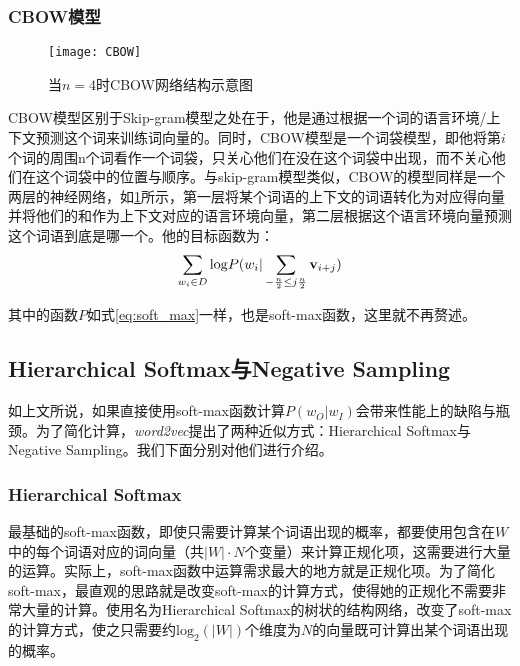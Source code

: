 \subsubsection{CBOW模型}

\begin{figure}
\centering
\texttt{[image: CBOW]}
\caption{当$n=4$时CBOW网络结构示意图}
\label{fig:CBOW}
\end{figure}

CBOW模型区别于Skip-gram模型之处在于，他是通过根据一个词的语言环境/上下文预测这个词来训练词向量的。同时，CBOW模型是一个词袋模型，即他将第$i$个词的周围n个词看作一个词袋，只关心他们在没在这个词袋中出现，而不关心他们在这个词袋中的位置与顺序。与skip-gram模型类似，CBOW的模型同样是一个两层的神经网络，如\ref{fig:CBOW}所示，第一层将某个词语的上下文的词语转化为对应得向量并将他们的和作为上下文对应的语言环境向量，第二层根据这个语言环境向量预测这个词语到底是哪一个。他的目标函数为：
\begin{eqnarray*}
\sum_{w_i \in D} \mathrm{log}P(w_{i} | \sum_{-\frac{n}{2}\leq j \frac{n}{2}} {{\mathbf v}}_{i+j})
\end{eqnarray*}

其中的函数$P$如式\ref{eq:soft_max}一样，也是soft-max函数，这里就不再赘述。

\subsection{Hierarchical Softmax与Negative Sampling}

如上文所说，如果直接使用soft-max函数计算$P(w_O | w_I)$会带来性能上的缺陷与瓶颈。为了简化计算，\emph{word2vec}提出了两种近似方式：Hierarchical Softmax与Negative Sampling。我们下面分别对他们进行介绍。

\subsubsection{Hierarchical Softmax}

最基础的soft-max函数，即使只需要计算某个词语出现的概率，都要使用包含在$W$中的每个词语对应的词向量（共$|W|\cdot N$个变量）来计算正规化项，这需要进行大量的运算。实际上，soft-max函数中运算需求最大的地方就是正规化项。为了简化soft-max，最直观的思路就是改变soft-max的计算方式，使得她的正规化不需要非常大量的计算。\cite{morin2005hierarchical}使用名为Hierarchical Softmax的树状的结构网络，改变了soft-max的计算方式，使之只需要约$\mathrm{log}_2(|W|)$个维度为$N$的向量既可计算出某个词语出现的概率。

